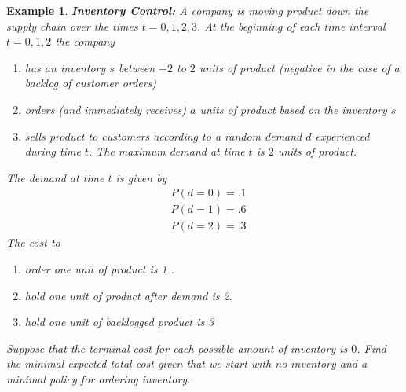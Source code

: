 \documentclass[12pt]{amsart}
\newtheorem{exm}[thm]{Example}
\begin{document}
\begin{exm}{\textbf{Inventory Control:}} 
A company is moving product down the supply chain over the times $t=0, 1, 2, 3$. At the beginning of each time interval $t = 0, 1, 2$ the company 

\begin{enumerate}
\item has an inventory $s$ between $-2$ to $2$ units of product (negative in the case of a backlog of customer orders) 
\item orders (and immediately receives) $a$ units of product based on the inventory $s$
\item sells product to customers according to a random demand $d$ experienced during time $t$. The maximum demand at time $t$ is $2$ units of product.
\end{enumerate}
The demand at time $t$ is given by
\begin{align*}
&P(d=0) = .1\\
&P(d=1) = .6\\
&P(d=2) = .3
\end{align*} 
The cost to
\begin{enumerate}
\item  order one unit of product is 1 .
\item  hold one unit of product after demand is 2.
\item  hold one unit of backlogged product is 3
\end{enumerate}

Suppose that the terminal cost for each possible amount of inventory is $0$. Find the minimal expected total cost given that we start with no inventory and a minimal policy for ordering inventory.
\end{exm}
\end{document}

